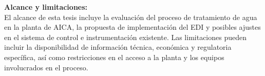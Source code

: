 \textbf{Alcance y limitaciones:}\\
El alcance de esta tesis incluye la evaluación del proceso de tratamiento de agua en la planta de AICA, la propuesta de implementación del EDI y posibles ajustes en el sistema de control e instrumentación existente. Las limitaciones pueden incluir la disponibilidad de información técnica, económica y regulatoria específica, así como restricciones en el acceso a la planta y los equipos involucrados en el proceso.


